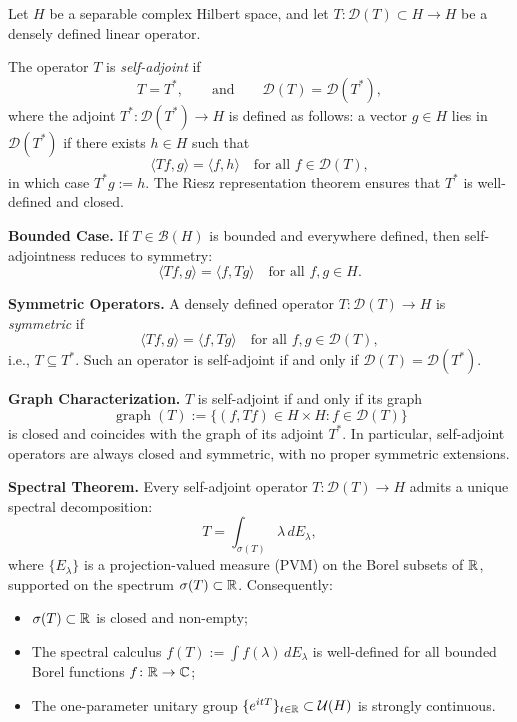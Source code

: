 \begin{definition}\label{def:selfadjoint_operator}
Let \( H \) be a separable complex Hilbert space, and let \( T \colon \mathcal{D}(T) \subset H \to H \) be a densely defined linear operator.

The operator \( T \) is \emph{self-adjoint} if
\[
T = T^*, \qquad \text{and} \qquad \mathcal{D}(T) = \mathcal{D}(T^*),
\]
where the adjoint \( T^* \colon \mathcal{D}(T^*) \to H \) is defined as follows: a vector \( g \in H \) lies in \( \mathcal{D}(T^*) \) if there exists \( h \in H \) such that
\[
\langle T f, g \rangle = \langle f, h \rangle \quad \text{for all } f \in \mathcal{D}(T),
\]
in which case \( T^* g := h \). The Riesz representation theorem ensures that \( T^* \) is well-defined and closed.

\medskip
\noindent\textbf{Bounded Case.}
If \( T \in \mathcal{B}(H) \) is bounded and everywhere defined, then self-adjointness reduces to symmetry:
\[
\langle T f, g \rangle = \langle f, T g \rangle \quad \text{for all } f, g \in H.
\]

\medskip
\noindent\textbf{Symmetric Operators.}
A densely defined operator \( T \colon \mathcal{D}(T) \to H \) is \emph{symmetric} if
\[
\langle T f, g \rangle = \langle f, T g \rangle \quad \text{for all } f, g \in \mathcal{D}(T),
\]
i.e., \( T \subseteq T^* \). Such an operator is self-adjoint if and only if \( \mathcal{D}(T) = \mathcal{D}(T^*) \).

\medskip
\noindent\textbf{Graph Characterization.}
\( T \) is self-adjoint if and only if its graph
\[
\operatorname{graph}(T) := \{ (f, Tf) \in H \times H : f \in \mathcal{D}(T) \}
\]
is closed and coincides with the graph of its adjoint \( T^* \). In particular, self-adjoint operators are always closed and symmetric, with no proper symmetric extensions.

\medskip
\noindent\textbf{Spectral Theorem.}
Every self-adjoint operator \( T \colon \mathcal{D}(T) \to H \) admits a unique spectral decomposition:
\[
T = \int_{\sigma(T)} \lambda \, dE_\lambda,
\]
where \( \{ E_\lambda \} \) is a projection-valued measure (PVM) on the Borel subsets of \( \mathbb{R} \), supported on the spectrum \( \sigma(T) \subset \mathbb{R} \). Consequently:
\begin{itemize}
    \item \( \sigma(T) \subset \mathbb{R} \) is closed and non-empty;
    \item The spectral calculus \( f(T) := \int f(\lambda)\, dE_\lambda \) is well-defined for all bounded Borel functions \( f \colon \mathbb{R} \to \mathbb{C} \);
    \item The one-parameter unitary group \( \{ e^{itT} \}_{t \in \mathbb{R}} \subset \mathcal{U}(H) \) is strongly continuous.
\end{itemize}


\end{definition}
